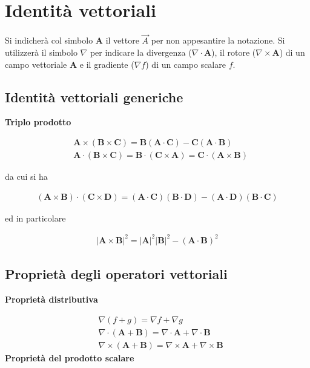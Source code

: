 \chapter{Identità vettoriali}

Si indicherà col simbolo $\mathbf{A}$ il vettore $\vec{A}$ per non appesantire la notazione. Si utilizzerà il simbolo $\nabla$ per indicare la divergenza ($\nabla\cdot\mathbf{A}$), il rotore ($\nabla\times\mathbf{A}$) di un campo vettoriale $\mathbf{A}$ e il gradiente ($\nabla f$) di un campo scalare $f$.

\section{Identità vettoriali generiche}

\textbf{Triplo prodotto}

\begin{align*}
	&\mathbf{A} \times (\mathbf{B} \times \mathbf{C}) = \mathbf{B} (\mathbf{A} \cdot \mathbf{C}) - \mathbf{C} (\mathbf{A} \cdot \mathbf{B}) \\
	&\mathbf{A} \cdot (\mathbf{B} \times \mathbf{C}) = \mathbf{B} \cdot (\mathbf{C} \times \mathbf{A}) = \mathbf{C} \cdot (\mathbf{A} \times \mathbf{B})
\end{align*}

da cui si ha

\begin{align*}
	(\mathbf{A} \times \mathbf{B}) \cdot (\mathbf{C} \times \mathbf{D}) = (\mathbf{A} \cdot \mathbf{C}) (\mathbf{B} \cdot \mathbf{D}) - (\mathbf{A} \cdot \mathbf{D}) (\mathbf{B} \cdot \mathbf{C})
\end{align*}

ed in particolare

\begin{align*}
	|\mathbf{A} \times \mathbf{B}|^2 = |\mathbf{A}|^2 |\mathbf{B}|^2 - (\mathbf{A} \cdot \mathbf{B})^2
\end{align*}

\section{Proprietà degli operatori vettoriali}

\textbf{Proprietà distributiva}

\begin{align*}
	& \nabla (f+g) = \nabla f + \nabla g \\
	& \nabla \cdot ( \mathbf{A} + \mathbf{B} ) = \nabla \cdot \mathbf{A} + \nabla \cdot \mathbf{B} \\
	& \nabla \times ( \mathbf{A} + \mathbf{B} ) = \nabla \times \mathbf{A} + \nabla \times \mathbf{B}
\end{align*}
\textbf{Proprietà del prodotto scalare}

